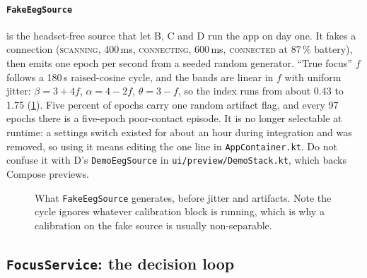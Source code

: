 \documentclass[10pt,a4paper]{article}
\newcommand{\file}[1]{\texttt{\small #1}}          %
\newcommand{\code}[1]{\texttt{#1}}                  %
\begin{document}
\paragraph{\code{FakeEegSource}} is the headset-free source that let B, C and D run the app on
day one. It fakes a connection (\textsc{scanning}, 400\,ms, \textsc{connecting}, 600\,ms,
\textsc{connected} at 87\,\% battery), then emits one epoch per second from a seeded random
generator. ``True focus'' $f$ follows a 180\,s raised-cosine cycle, and the bands are linear in
$f$ with uniform jitter: $\beta = 3 + 4f$, $\alpha = 4 - 2f$, $\theta = 3 - f$, so the index runs
from about 0.43 to 1.75 (\cref{fig:fake}). Five percent of epochs carry one random artifact flag,
and every 97 epochs there is a five-epoch poor-contact episode. It is no longer selectable at
runtime: a settings switch existed for about an hour during integration and was removed, so using
it means editing the one line in \file{AppContainer.kt}. Do not confuse it with D's
\code{DemoEegSource} in \file{ui/preview/DemoStack.kt}, which backs Compose previews.

\begin{figure}[htbp]\centering
{}
\caption{What \code{FakeEegSource} generates, before jitter and artifacts. Note the cycle ignores
whatever calibration block is running, which is why a calibration on the fake source is usually
non-separable.}\label{fig:fake}
\end{figure}

\subsection{\code{FocusService}: the decision loop}
\end{document}
